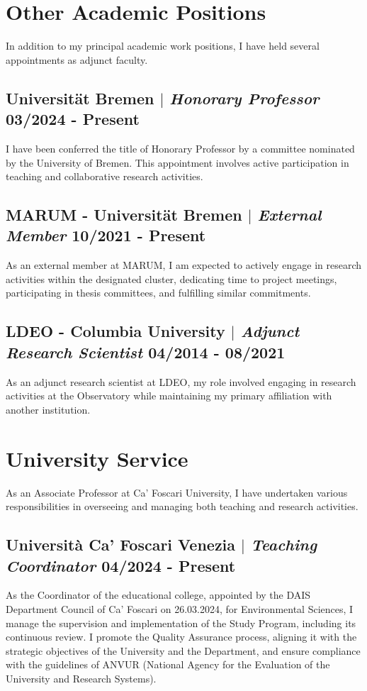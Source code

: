 \documentclass[11pt]{article}
\begin{document}
\section{Other Academic Positions}
{\normalfont In addition to my principal academic work positions, I have held several appointments as adjunct faculty.}\\
\bigskip

\subsection{Universität Bremen $|$ {\normalfont\textit{Honorary Professor}} \hfill 03/2024 - Present}
{\footnotesize I have been conferred the title of Honorary Professor by a committee nominated by the University of Bremen. This appointment involves active participation in teaching and collaborative research activities.}
\bigskip

\subsection{MARUM - Universität Bremen $|$ {\normalfont\textit{External Member}} \hfill 10/2021 - Present}
{\footnotesize As an external member at MARUM, I am expected to actively engage in research activities within the designated cluster, dedicating time to project meetings, participating in thesis committees, and fulfilling similar commitments.}
\bigskip

\subsection{LDEO - Columbia University $|$ {\normalfont\textit{Adjunct Research Scientist}} \hfill 04/2014 - 08/2021}
{\footnotesize As an adjunct research scientist at LDEO, my role involved engaging in research activities at the Observatory while maintaining my primary affiliation with another institution.}

\section{University Service}
{\normalfont As an Associate Professor at Ca' Foscari University, I have undertaken various responsibilities in overseeing and managing both teaching and research activities.}\\
\bigskip
\subsection{Università Ca' Foscari Venezia  $|$ {\normalfont\textit{Teaching Coordinator}} \hfill 04/2024 - Present}
{\footnotesize As the Coordinator of the educational college, appointed by the DAIS Department Council of Ca' Foscari on 26.03.2024, for Environmental Sciences, I manage the supervision and implementation of the Study Program, including its continuous review. I promote the Quality Assurance process, aligning it with the strategic objectives of the University and the Department, and ensure compliance with the guidelines of ANVUR (National Agency for the Evaluation of the University and Research Systems).}
\end{document}
